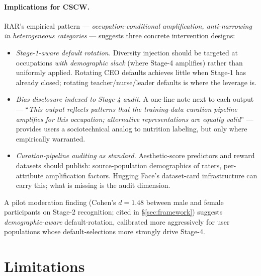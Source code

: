 \documentclass[manuscript, nonacm, screen, review]{acmart}
\begin{document}
\paragraph{Implications for CSCW.} RAR's empirical pattern --- \emph{occupation-conditional amplification, anti-narrowing in heterogeneous categories} --- suggests three concrete intervention designs:
\begin{itemize}\itemsep0pt
\item \emph{Stage-1-aware default rotation.} Diversity injection should be targeted at occupations \emph{with demographic slack} (where Stage-4 amplifies) rather than uniformly applied. Rotating CEO defaults achieves little when Stage-1 has already closed; rotating teacher/nurse/leader defaults is where the leverage is.
\item \emph{Bias disclosure indexed to Stage-4 audit.} A one-line note next to each output --- ``\emph{This output reflects patterns that the training-data curation pipeline amplifies for this occupation; alternative representations are equally valid}'' --- provides users a sociotechnical analog to nutrition labeling, but only where empirically warranted.
\item \emph{Curation-pipeline auditing as standard.} Aesthetic-score predictors and reward datasets should publish: source-population demographics of raters, per-attribute amplification factors. Hugging Face's dataset-card infrastructure can carry this; what is missing is the audit dimension.
\end{itemize}

A pilot moderation finding (Cohen's $d\!=\!1.48$ between male and female participants on Stage-2 recognition; cited in §\ref{sec:framework}) suggests \emph{demographic-aware} default-rotation, calibrated more aggressively for user populations whose default-selections more strongly drive Stage-4.

\section{Limitations}
\label{sec:limitations}
\end{document}
